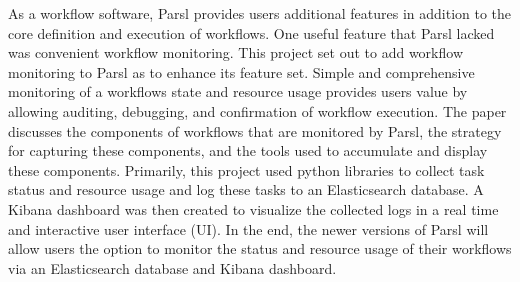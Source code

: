 As a workflow software, Parsl provides users additional features in addition to the core definition and execution of workflows.
One useful feature that Parsl lacked was convenient workflow monitoring.
This project set out to add workflow monitoring to Parsl as to enhance its feature set.
Simple and comprehensive monitoring of a workflows state and resource usage provides users value by allowing auditing, debugging, and confirmation of workflow execution.
The paper discusses the components of workflows that are monitored by Parsl, the strategy for capturing these components, and the tools used to accumulate and display these components.
Primarily, this project used python libraries to collect task status and resource usage and log these tasks to an Elasticsearch database.
A Kibana dashboard was then created to visualize the collected logs in a real time and interactive user interface (UI).
In the end, the newer versions of Parsl will allow users the option to monitor the status and resource usage of their workflows via an Elasticsearch database and Kibana dashboard.

